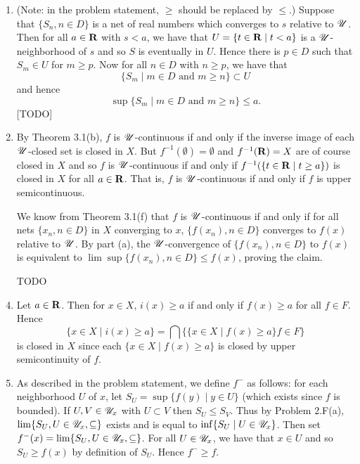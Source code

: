 \begin{prob}
\begin{enumerate}
\item (Note: in the problem statement, $\geq$ should be replaced by $\leq$.) Suppose that $\{S_n, n \in D\}$ is a net of real numbers which converges to $s$ relative to $\mathscr{U}$. Then for all $a \in \mathbf{R}$ with $s < a$, we have that $U = \{t \in \mathbf{R}\mid t < a\}$ is a $\mathscr{U}$-neighborhood of $s$ and so $S$ is eventually in $U$. Hence there is $p \in D$ such that $S_m \in U$ for $m \geq p$. Now for all $n \in D$ with $n \geq p$, we have that \[\{S_m\mid m \in D\text{ and }m \geq n\} \subset U\] and hence \[\sup\{S_m\mid m \in D\text{ and }m\geq n\} \leq a.\] [TODO]

\item By Theorem 3.1(b), $f$ is $\mathscr{U}$-continuous if and only if the inverse image of each $\mathscr{U}$-closed set is closed in $X$. But $f^{-1}(\emptyset) = \emptyset$ and $f^{-1}(\mathbf{R}) = X$ are of course closed in $X$ and so $f$ is $\mathscr{U}$-continuous if and only if $f^{-1}(\{t \in \mathbf{R}\mid t \geq a\})$ is closed in $X$ for all $a \in \mathbf{R}$. That is, $f$ is $\mathscr{U}$-continuous if and only if $f$ is upper semicontinuous.

We know from Theorem 3.1(f) that $f$ is $\mathscr{U}$-continuous if and only if for all nets $\{x_n, n \in D\}$ in $X$ converging to $x$, $\{f(x_n), n \in D\}$ converges to $f(x)$ relative to $\mathscr{U}$. By part (a), the $\mathscr{U}$-convergence of $\{f(x_n), n \in D\}$ to $f(x)$ is equivalent to $\lim\sup\{f(x_n), n \in D\} \leq f(x)$, proving the claim.

\item [TODO]

\item Let $a \in \mathbf{R}$. Then for $x \in X$, $i(x) \geq a$ if and only if $f(x) \geq a$ for all $f \in F$. Hence \[\{x \in X\mid i(x) \geq a\} = \bigcap\{\{x \in X\mid f(x) \geq a\}f \in F\}\] is closed in $X$ since each $\{x \in X\mid f(x) \geq a\}$ is closed by upper semicontinuity of $f$.

\item As described in the problem statement, we define $f^-$ as follows: for each neighborhood $U$ of $x$, let $S_U = \sup\{f(y)\mid y \in U\}$ (which exists since $f$ is bounded). If $U, V \in \mathscr{U}_x$ with $U \subset V$ then $S_U \leq S_V$. Thus by Problem 2.F(a), $\lim\{S_U, U \in \mathscr{U}_x, \subseteq\}$ exists and is equal to $\inf\{S_U\mid U \in \mathscr{U}_x\}$. Then set $f^-(x) = \lim\{S_U, U \in \mathscr{U}_x, \subseteq\}$. For all $U \in \mathscr{U}_x$, we have that $x \in U$ and so $S_U \geq f(x)$ by definition of $S_U$. Hence $f^- \geq f$.


\end{enumerate}
\end{prob}

